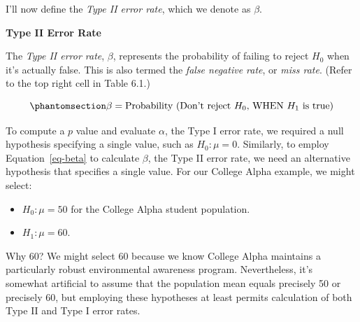 \documentclass[
  letterpaper,
  DIV=11,
  numbers=noendperiod]{scrreprt}
\providecommand{\tightlist}{%
  \setlength{\itemsep}{0pt}\setlength{\parskip}{0pt}}
\begin{document}
I'll now define the \emph{Type II error rate}, which we denote as
\(\beta\).

\begin{tcolorbox}[enhanced jigsaw, colframe=quarto-callout-note-color-frame, left=2mm, leftrule=.75mm, rightrule=.15mm, opacityback=0, arc=.35mm, colback=white, bottomrule=.15mm, breakable, toprule=.15mm]
\begin{minipage}[t]{5.5mm}
\textcolor{quarto-callout-note-color}{\faInfo}
\end{minipage}%
\begin{minipage}[t]{\textwidth - 5.5mm}

\vspace{-3mm}\textbf{Type II Error Rate}\vspace{3mm}

The \emph{Type II error rate}, \(\beta\), represents the probability of
failing to reject \(H_0\) when it's actually false. This is also termed
the \emph{false negative rate}, or \emph{miss rate}. (Refer to the top
right cell in Table 6.1.)

\end{minipage}%
\end{tcolorbox}

\begin{equation}\phantomsection\label{eq-beta}{
\beta = \text{Probability (Don't reject } H_0\text{, WHEN } H_1 \text{ is true)}
}\end{equation}

To compute a \(p\) value and evaluate \(\alpha\), the Type I error rate,
we required a null hypothesis specifying a single value, such as
\(H_0: \mu = 0\). Similarly, to employ Equation~\ref{eq-beta} to
calculate \(\beta\), the Type II error rate, we need an alternative
hypothesis that specifies a single value. For our College Alpha example,
we might select:

\begin{itemize}
\tightlist
\item
  \(H_0: \mu = 50\) for the College Alpha student population.
\item
  \(H_1: \mu = 60\).
\end{itemize}

Why 60? We might select 60 because we know College Alpha maintains a
particularly robust environmental awareness program. Nevertheless, it's
somewhat artificial to assume that the population mean equals precisely
50 or precisely 60, but employing these hypotheses at least permits
calculation of both Type II and Type I error rates.
\end{document}
